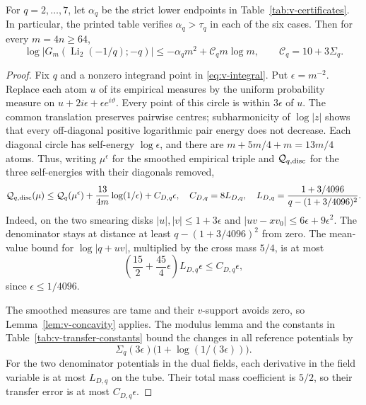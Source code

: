 For $q=2,\ldots,7$, let $\alpha_q$ be the strict lower endpoints in
Table~\ref{tab:v-certificates}.  In particular, the printed table verifies
$\alpha_q>\tau_q$ in each of the six cases.  Then for every
$m=4n\ge64$,
\begin{equation}\label{eq:v-allm-bound}
 \log|G_m(\operatorname{Li}_2(-1/q);-q)|
 \le-\alpha_qm^2+\mathcal C_qm\log m,
 \qquad \mathcal C_q=10+3\Sigma_q.
\end{equation}
\begin{proof}
Fix $q$ and a nonzero integrand point in \eqref{eq:v-integral}.  Put
$\epsilon=m^{-2}$.  Replace each atom $u$ of its empirical measures by
the uniform probability measure on
$u+2i\epsilon+\epsilon e^{i\vartheta}$.  Every point of this circle is
within $3\epsilon$ of $u$.  The common translation preserves pairwise
centres; subharmonicity of $\log|z|$ shows that every off-diagonal positive
logarithmic pair energy does not decrease.  Each diagonal circle has
self-energy $\log\epsilon$, and there are $m+5m/4+m=13m/4$ atoms.  Thus,
writing $\mu^\epsilon$ for the smoothed empirical triple and
$\mathcal Q_{q,\rm disc}$ for the three self-energies with their diagonals
removed,
\[
 \mathcal Q_{q,\rm disc}(\mu)
 \le\mathcal Q_q(\mu^\epsilon)
       +\frac{13}{4m}\log(1/\epsilon)+C_{D,q}\epsilon,
 \quad C_{D,q}=8L_{D,q},
 \quad L_{D,q}=\frac{1+3/4096}{q-(1+3/4096)^2}.
\]
Indeed, on the two smearing disks $|u|,|v|\le1+3\epsilon$ and
$|uv-xv_0|\le6\epsilon+9\epsilon^2$.  The denominator stays at distance
at least $q-(1+3/4096)^2$ from zero.  The mean-value bound for
$\log|q+uv|$, multiplied by the cross mass $5/4$, is at most
\[
\left(\frac{15}{2}+\frac{45}{4}\epsilon\right)L_{D,q}\epsilon
\le C_{D,q}\epsilon,
\]
since $\epsilon\le1/4096$.

The smoothed measures are tame and their $v$-support avoids zero, so
Lemma~\ref{lem:v-concavity} applies.  The modulus lemma and the constants
in Table~\ref{tab:v-transfer-constants} bound the changes in all reference
potentials by
\[
 \Sigma_q(3\epsilon)\bigl(1+\log(1/(3\epsilon))\bigr).
\]
For the two denominator potentials in the dual fields, each derivative in
the field variable is at most $L_{D,q}$ on the tube.  Their total mass
coefficient is $5/2$, so their transfer error is at most
$C_{D,q}\epsilon$.


\end{proof}
